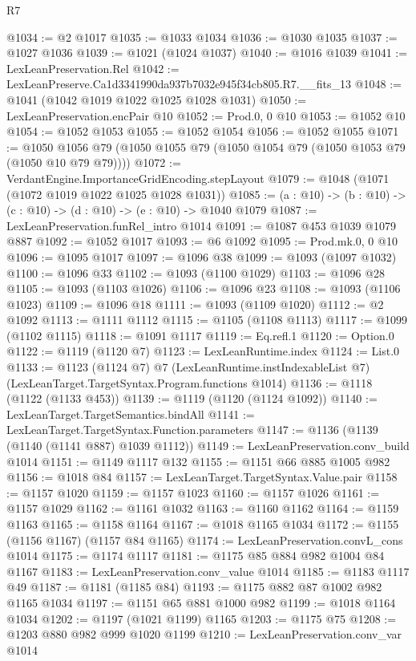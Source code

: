 \begin{lexlean}{R7}
\begin{coremodule}
@1034 := @2 @1017
@1035 := @1033 @1034
@1036 := @1030 @1035
@1037 := @1027 @1036
@1039 := @1021 (@1024 @1037)
@1040 := @1016 @1039
@1041 := LexLeanPreservation.Rel
@1042 := LexLeanPreserve.Ca1d3341990da937b7032e945f34cb805.R7.__fits_13
@1048 := @1041 (@1042 @1019 @1022 @1025 @1028 @1031)
@1050 := LexLeanPreservation.encPair @10
@1052 := Prod.{0, 0} @10
@1053 := @1052 @10
@1054 := @1052 @1053
@1055 := @1052 @1054
@1056 := @1052 @1055
@1071 := @1050 @1056 @79 (@1050 @1055 @79 (@1050 @1054 @79 (@1050 @1053 @79 (@1050 @10 @79 @79))))
@1072 := VerdantEngine.ImportanceGridEncoding.stepLayout
@1079 := @1048 (@1071 (@1072 @1019 @1022 @1025 @1028 @1031))
@1085 := (a : @10) -> (b : @10) -> (c : @10) -> (d : @10) -> (e : @10) -> @1040 @1079
@1087 := LexLeanPreservation.funRel_intro @1014
@1091 := @1087 @453 @1039 @1079 @887
@1092 := @1052 @1017
@1093 := @6 @1092
@1095 := Prod.mk.{0, 0} @10
@1096 := @1095 @1017
@1097 := @1096 @38
@1099 := @1093 (@1097 @1032)
@1100 := @1096 @33
@1102 := @1093 (@1100 @1029)
@1103 := @1096 @28
@1105 := @1093 (@1103 @1026)
@1106 := @1096 @23
@1108 := @1093 (@1106 @1023)
@1109 := @1096 @18
@1111 := @1093 (@1109 @1020)
@1112 := @2 @1092
@1113 := @1111 @1112
@1115 := @1105 (@1108 @1113)
@1117 := @1099 (@1102 @1115)
@1118 := @1091 @1117
@1119 := Eq.refl.{1}
@1120 := Option.{0}
@1122 := @1119 (@1120 @7)
@1123 := LexLeanRuntime.index
@1124 := List.{0}
@1133 := @1123
    (@1124 @7)
    @7
    (LexLeanRuntime.instIndexableList @7)
    (LexLeanTarget.TargetSyntax.Program.functions @1014)
@1136 := @1118 (@1122 (@1133 @453))
@1139 := @1119 (@1120 (@1124 @1092))
@1140 := LexLeanTarget.TargetSemantics.bindAll
@1141 := LexLeanTarget.TargetSyntax.Function.parameters
@1147 := @1136 (@1139 (@1140 (@1141 @887) @1039 @1112))
@1149 := LexLeanPreservation.conv_build @1014
@1151 := @1149 @1117 @132
@1155 := @1151 @66 @885 @1005 @982
@1156 := @1018 @84
@1157 := LexLeanTarget.TargetSyntax.Value.pair
@1158 := @1157 @1020
@1159 := @1157 @1023
@1160 := @1157 @1026
@1161 := @1157 @1029
@1162 := @1161 @1032
@1163 := @1160 @1162
@1164 := @1159 @1163
@1165 := @1158 @1164
@1167 := @1018 @1165 @1034
@1172 := @1155 (@1156 @1167) (@1157 @84 @1165)
@1174 := LexLeanPreservation.convL_cons @1014
@1175 := @1174 @1117
@1181 := @1175 @85 @884 @982 @1004 @84 @1167
@1183 := LexLeanPreservation.conv_value @1014
@1185 := @1183 @1117 @49
@1187 := @1181 (@1185 @84)
@1193 := @1175 @882 @87 @1002 @982 @1165 @1034
@1197 := @1151 @65 @881 @1000 @982
@1199 := @1018 @1164 @1034
@1202 := @1197 (@1021 @1199) @1165
@1203 := @1175 @75
@1208 := @1203 @880 @982 @999 @1020 @1199
@1210 := LexLeanPreservation.conv_var @1014

\end{coremodule}
\end{lexlean}
